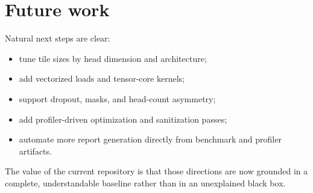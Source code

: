 \section{Future work}

Natural next steps are clear:
\begin{itemize}
  \item tune tile sizes by head dimension and architecture;
  \item add vectorized loads and tensor-core kernels;
  \item support dropout, masks, and head-count asymmetry;
  \item add profiler-driven optimization and sanitization passes;
  \item automate more report generation directly from benchmark and profiler artifacts.
\end{itemize}

The value of the current repository is that those directions are now grounded in a complete, understandable baseline rather than in an unexplained black box.
